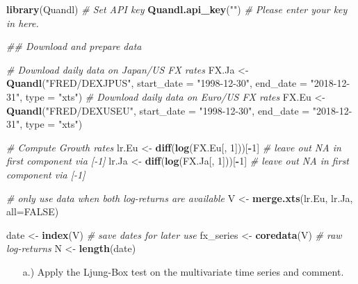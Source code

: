 \documentclass[12pt,a4paper]{article}
\newenvironment{Shaded}{\begin{snugshade}}{\end{snugshade}}
\newcommand{\CommentTok}[1]{\textcolor[rgb]{0.56,0.35,0.01}{\textit{#1}}}
\newcommand{\DataTypeTok}[1]{\textcolor[rgb]{0.13,0.29,0.53}{#1}}
\newcommand{\DecValTok}[1]{\textcolor[rgb]{0.00,0.00,0.81}{#1}}
\newcommand{\KeywordTok}[1]{\textcolor[rgb]{0.13,0.29,0.53}{\textbf{#1}}}
\newcommand{\NormalTok}[1]{#1}
\newcommand{\OperatorTok}[1]{\textcolor[rgb]{0.81,0.36,0.00}{\textbf{#1}}}
\newcommand{\OtherTok}[1]{\textcolor[rgb]{0.56,0.35,0.01}{#1}}
\newcommand{\StringTok}[1]{\textcolor[rgb]{0.31,0.60,0.02}{#1}}
\begin{document}
\begin{Shaded}
\begin{Highlighting}[]
\KeywordTok{library}\NormalTok{(Quandl)}
\CommentTok{# Set API key}
\KeywordTok{Quandl.api_key}\NormalTok{(}\StringTok{""}\NormalTok{) }\CommentTok{# Please enter your key in here.}

\CommentTok{## Download and prepare data}

\CommentTok{# Download daily data on Japan/US FX rates}
\NormalTok{FX.Ja   <-}\StringTok{ }\KeywordTok{Quandl}\NormalTok{(}\StringTok{"FRED/DEXJPUS"}\NormalTok{, }\DataTypeTok{start_date =} \StringTok{"1998-12-30"}\NormalTok{, }
                  \DataTypeTok{end_date =} \StringTok{"2018-12-31"}\NormalTok{, }\DataTypeTok{type =} \StringTok{"xts"}\NormalTok{)   }
\CommentTok{# Download daily data on Euro/US FX rates}
\NormalTok{FX.Eu   <-}\StringTok{ }\KeywordTok{Quandl}\NormalTok{(}\StringTok{"FRED/DEXUSEU"}\NormalTok{, }\DataTypeTok{start_date =} \StringTok{"1998-12-30"}\NormalTok{, }
                  \DataTypeTok{end_date =} \StringTok{"2018-12-31"}\NormalTok{, }\DataTypeTok{type =} \StringTok{"xts"}\NormalTok{)  }

\CommentTok{# Compute Growth rates}
\NormalTok{lr.Eu <-}\StringTok{ }\KeywordTok{diff}\NormalTok{(}\KeywordTok{log}\NormalTok{(FX.Eu[, }\DecValTok{1}\NormalTok{]))[}\OperatorTok{-}\DecValTok{1}\NormalTok{] }\CommentTok{# leave out NA in first component via [-1]}
\NormalTok{lr.Ja <-}\StringTok{ }\KeywordTok{diff}\NormalTok{(}\KeywordTok{log}\NormalTok{(FX.Ja[, }\DecValTok{1}\NormalTok{]))[}\OperatorTok{-}\DecValTok{1}\NormalTok{] }\CommentTok{# leave out NA in first component via [-1]}

\CommentTok{# only use data when both log-returns are available}
\NormalTok{V         <-}\StringTok{ }\KeywordTok{merge.xts}\NormalTok{(lr.Eu, lr.Ja, }\DataTypeTok{all=}\OtherTok{FALSE}\NormalTok{)  }

\NormalTok{date      <-}\StringTok{ }\KeywordTok{index}\NormalTok{(V)   }\CommentTok{# save dates for later use}
\NormalTok{fx_series <-}\StringTok{ }\KeywordTok{coredata}\NormalTok{(V)  }\CommentTok{# raw log-returns}
\NormalTok{N         <-}\StringTok{ }\KeywordTok{length}\NormalTok{(date)}
\end{Highlighting}
\end{Shaded}

\begin{itemize}
  \item[a.)] Apply the Ljung-Box test on the multivariate time series and comment. 
\end{itemize}
\end{document}
